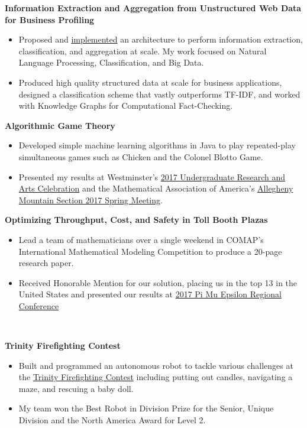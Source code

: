 \documentclass[letterpaper,11pt]{article}
\newcommand{\resitem}[1]{\item #1 \vspace{-2pt}}
\newcommand{\resheading}[1]{{\large \colorbox{mypurple}{\begin{minipage}{\textwidth}{\textbf{#1 \vphantom{p\^{E}}}}\end{minipage}}}}
\begin{document}
		\textbf{Information Extraction and Aggregation from Unstructured Web Data for Business Profiling}
		\begin{itemize}
			\resitem{Proposed and \href{https://github.com/himahuja/pcatxcore}{implemented} an architecture to perform information extraction, classification, and aggregation at scale. My work focused on Natural Language Processing, Classification, and Big Data.}
			\resitem{Produced high quality structured data at scale for business applications, designed a classification scheme that vastly outperforms TF-IDF, and worked with Knowledge Graphs for Computational Fact-Checking.}
		\end{itemize}

		\textbf{Algorithmic Game Theory}
		\begin{itemize}
			\resitem{Developed simple machine learning algorithms in Java to play repeated-play simultaneous games such as Chicken and the Colonel Blotto Game.}
			\resitem{Presented my results at Westminster's \href{https://alexandermichels.github.io/docs/2017-urac-schedule.pdf}{2017 Undergraduate Research and Arts Celebration} and the Mathematical Association of America's \href{https://alexandermichels.github.io/docs/MAA2017Abstracts.pdf}{Allegheny Mountain Section 2017 Spring Meeting}.}
		\end{itemize}
	
		\textbf{Optimizing Throughput, Cost, and Safety in Toll Booth Plazas}
		\begin{itemize}
			\resitem{Lead a team of mathematicians over a single weekend in COMAP's International Mathematical Modeling Competition to produce a 20-page research paper.}
			\resitem{Received Honorable Mention for our solution, placing us in the top 13 in the United States and presented our results at \href{https://alexandermichels.github.io/docs/PME2017Program.pdf}{2017 Pi Mu Epsilon Regional Conference}}
		\end{itemize}
	
	\resheading{\textcolor{white}{Projects}}
	
			\vspace{0.1in}
	
	\textbf{Trinity Firefighting Contest}
	\begin{itemize}
		\resitem{Built and programmed an autonomous robot to tackle various challenges at the \href{https://trinityrobotcontest.org/}{Trinity Firefighting Contest} including putting out candles, navigating a maze, and rescuing a baby doll.}
		\resitem{My team won the Best Robot in Division Prize for the Senior, Unique Division and the North America Award for Level 2.}
	\end{itemize}
	
\end{document}
